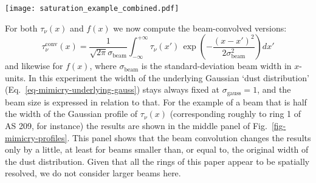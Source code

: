 \documentclass{aa}
\begin{document}
\begin{figure*}
\centerline{\texttt{[image: saturation\_example\_combined.pdf]}}
\caption{\label{fig-mimicry-profiles}Demonstration of the Gaussian 'mimicry'
  effect discussed in Appendix \ref{sec-mimicry-flat-topped}. Left panel:
  Profiles before beam-convolution. Solid curves show the radiative transfer
  result $f(x)=1-e^{-\tau_\nu(x)}$, dotted curves show the underlying
  $\tau_\nu(x)$.  Middle panel is the same, but convolved with a beam that is
  half the width of the Gaussian profile of $\tau_\nu(x)$. Right panel: Solid
  lines are the same as for the middle panel, but the dashed lines are the best
  fit Gaussian curves (also convolved with the beam).}
\end{figure*}

For both $\tau_\nu(x)$ and $f(x)$ we now compute the beam-convolved versions:
\begin{equation}
  \tau_\nu^{\mathrm{conv}}(x) = \frac{1}{\sqrt{2\pi}\sigma_{\mathrm{beam}}}\int_{-\infty}^{+\infty}
  \tau_\nu(x')\,\exp\left(-\frac{(x-x')^2}{2\sigma_{\mathrm{beam}}^2}\right)dx'
\end{equation}
and likewise for $f(x)$, where $\sigma_{\mathrm{beam}}$ is the
standard-deviation beam width in $x$-units. In this experiment the width of the
underlying Gaussian `dust distribution' (Eq.~\ref{eq-mimicry-underlying-gauss})
stays always fixed at $\sigma_{\mathrm{gauss}}=1$, and the beam size is
expressed in relation to that. For the example of a beam that is half the width
of the Gaussian profile of $\tau_\nu(x)$ (corresponding roughly to ring 1 of AS
209, for instance) the results are shown in the middle panel of
Fig.~\ref{fig-mimicry-profiles}. This panel shows that the beam convolution
changes the results only by a little, at least for beams smaller than, or equal
to, the original width of the dust distribution. Given that all the rings of
this paper appear to be spatially resolved, we do not consider larger beams
here.
\end{document}
